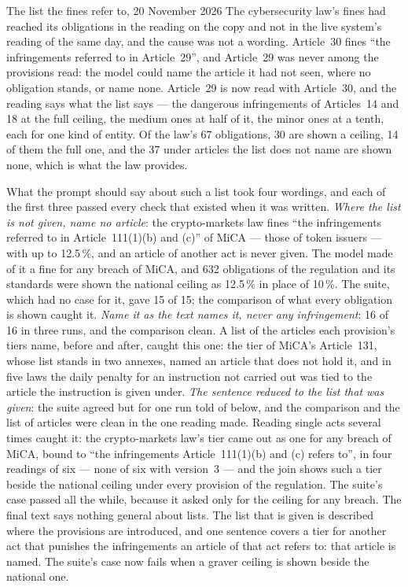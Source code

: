 \begin{lessonbox}{The list the fines refer to, 20 November 2026}
The cybersecurity law's fines had reached its obligations in the reading on the copy and not
in the live system's reading of the same day, and the cause was not a wording. Article~30
fines \enquote{the infringements referred to in Article~29}, and Article~29 was never among
the provisions read: the model could name the article it had not seen, where no obligation
stands, or name none. Article~29 is now read with Article~30, and the reading says what the
list says --- the dangerous infringements of Articles~14 and 18 at the full ceiling, the
medium ones at half of it, the minor ones at a tenth, each for one kind of entity. Of the
law's 67 obligations, 30 are shown a ceiling, 14 of them the full one, and the 37 under
articles the list does not name are shown none, which is what the law provides.

What the prompt should say about such a list took four wordings, and each of the first three
passed every check that existed when it was written. \emph{Where the list is not given, name
no article}: the crypto-markets law fines \enquote{the infringements referred to in
Article~111(1)(b) and (c)} of MiCA --- those of token issuers --- with up to 12.5\,\%, and
an article of another act is never given. The model made of it a fine for any breach of
MiCA, and 632 obligations of the regulation and its standards were shown the national
ceiling as 12.5\,\% in place of 10\,\%. The suite, which had no case for it, gave 15 of 15;
the comparison of what every obligation is shown caught it. \emph{Name it as the text names
it, never any infringement}: 16 of 16 in three runs, and the comparison clean. A list of
the articles each provision's tiers name, before and after, caught this one: the tier of
MiCA's Article~131, whose list stands in two annexes, named an article that does not hold
it, and in five laws the daily penalty for an instruction not carried out was tied to the
article the instruction is given under. \emph{The sentence reduced to the list that was
given}: the suite agreed but for one run told of below, and the comparison and the list of
articles were clean in the one reading made. Reading single acts several times caught it: the crypto-markets law's
tier came out as one for any breach of MiCA, bound to \enquote{the infringements
Article~111(1)(b) and (c) refers to}, in four readings of six --- none of six with
version~3 --- and the join shows such a tier beside the national ceiling under every
provision of the regulation. The suite's case passed all the while, because it asked only
for the ceiling for any breach. The final text says nothing general about lists. The list
that is given is described where the provisions are introduced, and one sentence covers a
tier for another act that punishes the infringements an article of that act refers to: that
article is named. The suite's case now fails when a graver ceiling is shown beside the
national one.


\end{lessonbox}
